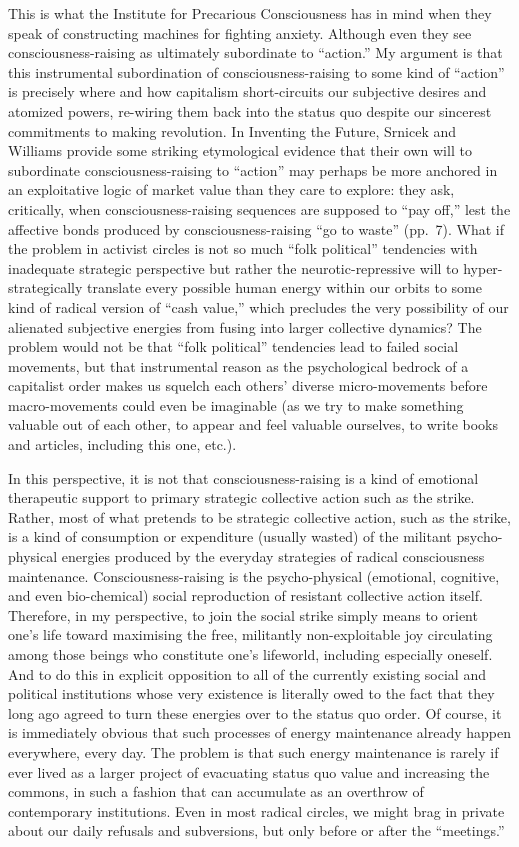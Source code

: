 \documentclass[a4paper,12pt,margin=.5in]{article}
\begin{document}
This is what the Institute for Precarious Consciousness has in mind when
they speak of constructing machines for fighting anxiety. Although even
they see consciousness-raising as ultimately subordinate to ``action.''
My argument is that this instrumental subordination of
consciousness-raising to some kind of ``action'' is precisely where and
how capitalism short-circuits our subjective desires and atomized
powers, re-wiring them back into the status quo despite our sincerest
commitments to making revolution. In Inventing the Future, Srnicek and
Williams provide some striking etymological evidence that their own will
to subordinate consciousness-raising to ``action'' may perhaps be more
anchored in an exploitative logic of market value than they care to
explore: they ask, critically, when consciousness-raising sequences are
supposed to ``pay off,'' lest the affective bonds produced by
consciousness-raising ``go to waste'' (pp.~7). What if the problem in
activist circles is not so much ``folk political'' tendencies with
inadequate strategic perspective but rather the neurotic-repressive will
to hyper-strategically translate every possible human energy within our
orbits to some kind of radical version of ``cash value,'' which
precludes the very possibility of our alienated subjective energies from
fusing into larger collective dynamics? The problem would not be that
``folk political'' tendencies lead to failed social movements, but that
instrumental reason as the psychological bedrock of a capitalist order
makes us squelch each others' diverse micro-movements before
macro-movements could even be imaginable (as we try to make something
valuable out of each other, to appear and feel valuable ourselves, to
write books and articles, including this one, etc.).

In this perspective, it is not that consciousness-raising is a kind of
emotional therapeutic support to primary strategic collective action
such as the strike. Rather, most of what pretends to be strategic
collective action, such as the strike, is a kind of consumption or
expenditure (usually wasted) of the militant psycho-physical energies
produced by the everyday strategies of radical consciousness
maintenance. Consciousness-raising is the psycho-physical (emotional,
cognitive, and even bio-chemical) social reproduction of resistant
collective action itself. Therefore, in my perspective, to join the
social strike simply means to orient one's life toward maximising the
free, militantly non-exploitable joy circulating among those beings who
constitute one's lifeworld, including especially oneself. And to do this
in explicit opposition to all of the currently existing social and
political institutions whose very existence is literally owed to the
fact that they long ago agreed to turn these energies over to the status
quo order. Of course, it is immediately obvious that such processes of
energy maintenance already happen everywhere, every day. The problem is
that such energy maintenance is rarely if ever lived as a larger project
of evacuating status quo value and increasing the commons, in such a
fashion that can accumulate as an overthrow of contemporary
institutions. Even in most radical circles, we might brag in private
about our daily refusals and subversions, but only before or after the
``meetings.''
\end{document}
